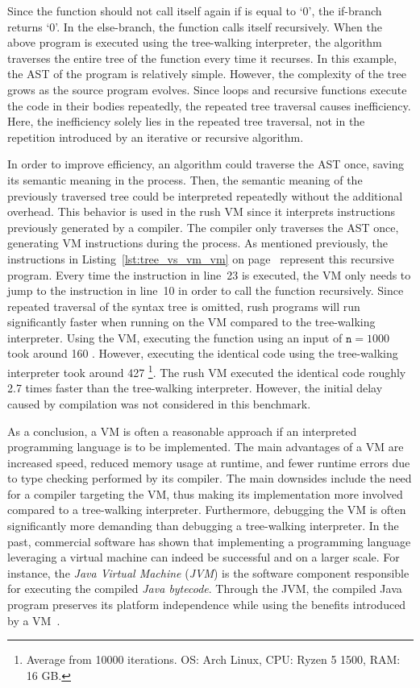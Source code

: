 Since the function should not call itself again if  is equal to `0', the if-branch returns `0'.
In the else-branch, the  function calls itself recursively.
When the above program is executed using the tree-walking interpreter, the algorithm traverses the entire tree of the  function every time it recurses.
In this example, the AST of the program is relatively simple.
However, the complexity of the tree grows as the source program evolves.
Since loops and recursive functions execute the code in their bodies repeatedly, the repeated tree traversal causes inefficiency.
Here, the inefficiency solely lies in the repeated tree traversal, not in the repetition introduced by an iterative or recursive algorithm.

In order to improve efficiency, an algorithm could traverse the AST once, saving its semantic meaning in the process.
Then, the semantic meaning of the previously traversed tree could be interpreted repeatedly without the additional overhead.
This behavior is used in the rush VM since it interprets instructions previously generated by a compiler.
The compiler only traverses the AST once, generating VM instructions during the process.
As mentioned previously, the instructions in Listing~\ref{lst:tree_vs_vm_vm} on page~\pageref{lst:tree_vs_vm_vm} represent this recursive program.
Every time the  instruction in line~23 is executed, the VM only needs to jump to the instruction in line~10 in order to call the  function recursively.
Since repeated traversal of the syntax tree is omitted, rush programs will run significantly faster when running on the VM compared to the tree-walking interpreter.
Using the VM, executing the  function using an input of $\texttt{n} = 1000$ took around 160 \si{\microsecond}.
However, executing the identical code using the tree-walking interpreter took around 427 \si{\microsecond}\footnote{Average from 10000 iterations. OS\@: Arch Linux, CPU\@: Ryzen 5 1500, RAM\@: 16 GB.}.
The rush VM executed the identical code roughly 2.7 times faster than the tree-walking interpreter.
However, the initial delay caused by compilation was not considered in this benchmark.

As a conclusion, a VM is often a reasonable approach if an interpreted programming language is to be implemented.
The main advantages of a VM are increased speed, reduced memory usage at runtime, and fewer runtime errors due to type checking performed by its compiler.
The main downsides include the need for a compiler targeting the VM, thus making its implementation more involved compared to a tree-walking interpreter.
Furthermore, debugging the VM is often significantly more demanding than debugging a tree-walking interpreter.
In the past, commercial software has shown that implementing a programming language leveraging a virtual machine can indeed be successful and on a larger scale.
For instance, the \emph{Java Virtual Machine} (\emph{JVM}) is the software component responsible for executing the compiled \emph{Java bytecode}.
Through the JVM, the compiled Java program preserves its platform independence while using the benefits introduced by a VM~\cite[Section~1.2]{Lindholm2014-jb}.
